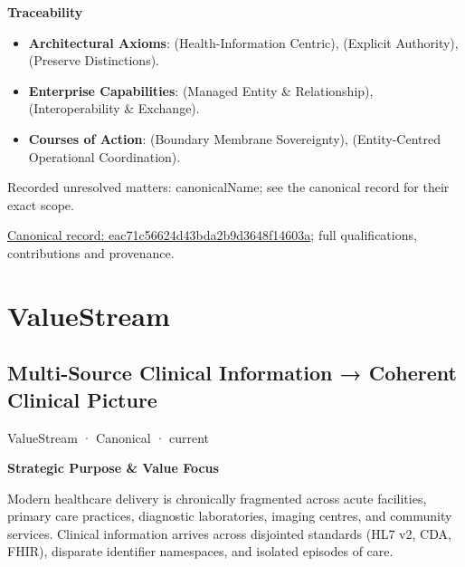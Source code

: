 \par\medskip\textbf{Traceability}\par


\begin{itemize}


\item \textbf{Architectural Axioms}: \texttt{} (Health-Information Centric), \texttt{} (Explicit Authority), \texttt{} (Preserve Distinctions).

\item \textbf{Enterprise Capabilities}: \texttt{} (Managed Entity \& Relationship), \texttt{} (Interoperability \& Exchange).

\item \textbf{Courses of Action}: \texttt{} (Boundary Membrane Sovereignty), \texttt{} (Entity-Centred Operational Coordination).

\end{itemize}

{\small Recorded unresolved matters: canonicalName; see the canonical record for their exact scope.}\par
{\footnotesize \href{../../../../continuum/strategy/resource/eac71c56624d43bda2b9d3648f14603a.md}{Canonical record: eac71c56624d43bda2b9d3648f14603a}; full qualifications, contributions and provenance.}\par
\section{ValueStream}

\subsection{Multi-Source Clinical Information → Coherent Clinical Picture}

\label{element:01f655eae3d8485699449c3dcf4f9b56}
{\small ValueStream · Canonical · current}\par

\par\medskip\textbf{Strategic Purpose \& Value Focus}\par


Modern healthcare delivery is chronically fragmented across acute facilities, primary care practices, diagnostic laboratories, imaging centres, and community services. Clinical information arrives across disjointed standards (HL7 v2, CDA, FHIR), disparate identifier namespaces, and isolated episodes of care.



